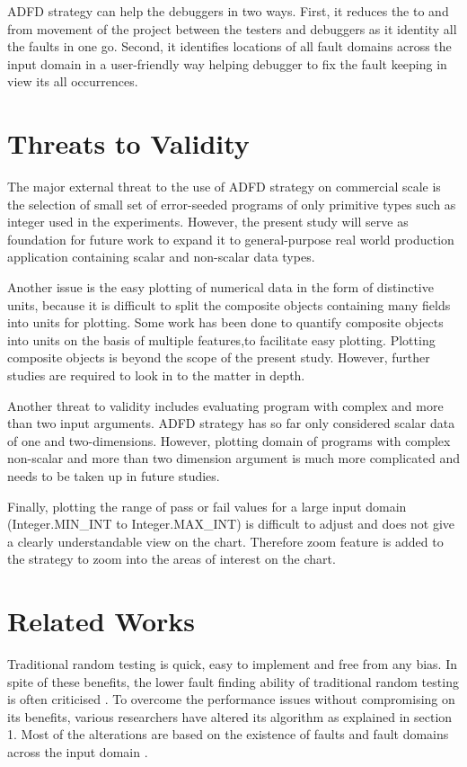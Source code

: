 ADFD strategy can help the debuggers in two ways. First, it reduces the to and from movement of the project between the testers and debuggers as it identity all the faults in one go. Second, it identifies locations of all fault domains across the input domain in a user-friendly way helping debugger to fix the fault keeping in view its all occurrences.


\section{Threats to Validity} \label{sec:validity}
The major external threat to the use of ADFD strategy on commercial scale is the selection of small set of error-seeded programs of only primitive types such as integer used in the experiments. However, the present study will serve as foundation for future work to expand it to general-purpose real world production application containing scalar and non-scalar data types.

Another issue is the easy plotting of numerical data in the form of distinctive units, because it is difficult to split the composite objects containing many fields into units for plotting. Some work has been done to quantify composite objects into units on the basis of multiple features\cite{Ciupa2006},to facilitate easy plotting. Plotting composite objects is beyond the scope of the present study. However, further studies are required to look in to the matter in depth. 

Another threat to validity includes evaluating program with complex and more than two input arguments. ADFD strategy has so far only considered scalar data of one and two-dimensions. However, plotting domain of programs with complex non-scalar and more than two dimension argument is much more complicated and needs to be taken up in future studies.

Finally, plotting the range of pass or fail values for a large input domain (Integer.MIN\_INT to Integer.MAX\_INT) is difficult to adjust and does not give a clearly understandable view on the chart. Therefore zoom feature is added to the strategy to zoom into the areas of interest on the chart.



\section{Related Works} \label{sec:relatedWork}
Traditional random testing is quick, easy to implement and free from any bias. In spite of these benefits, the lower fault finding ability of traditional random testing is often criticised \cite{Myers2011, Offutt1996}. To overcome the performance issues without compromising on its benefits, various researchers have altered its algorithm as explained in section 1. Most of the alterations are based on the existence of faults and fault domains across the input domain \cite{Chan1996}. 

